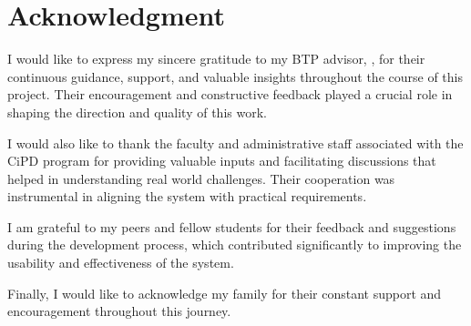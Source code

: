 \chapter*{Acknowledgment}

I would like to express my sincere gratitude to my BTP advisor, \advisorone, for their continuous
guidance, support, and valuable insights throughout the course of this project. Their encouragement
and constructive feedback played a crucial role in shaping the direction and quality of this work.

I would also like to thank the faculty and administrative staff associated with the CiPD program for
providing valuable inputs and facilitating discussions that helped in understanding real world
challenges. Their cooperation was instrumental in aligning the system with practical requirements.

I am grateful to my peers and fellow students for their feedback and suggestions during the
development process, which contributed significantly to improving the usability and effectiveness of
the system.

Finally, I would like to acknowledge my family for their constant support and encouragement
throughout this journey.

\newpage

